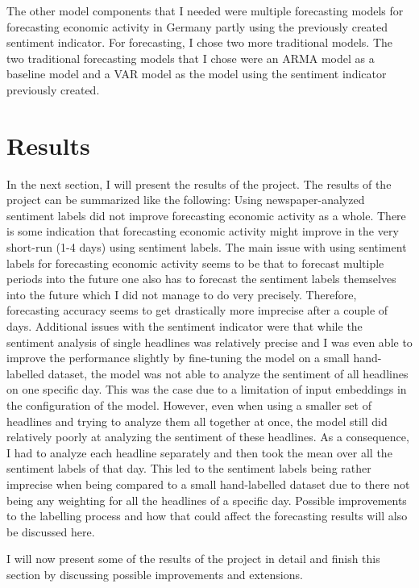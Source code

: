 \documentclass[11pt, a4paper, leqno]{article}
\begin{document}
The other model components that I needed were multiple forecasting models for forecasting economic activity in Germany partly using the previously created sentiment indicator. For forecasting, I chose two more traditional models. The two traditional forecasting models that I chose were an ARMA model as a baseline model and a VAR model as the model using the sentiment indicator previously created.

\section{Results}

In the next section, I will present the results of the project. The results of the project can be summarized like the following: Using newspaper-analyzed sentiment labels did not improve forecasting economic activity as a whole. There is some indication that forecasting economic activity might improve in the very short-run (1-4 days) using sentiment labels. The main issue with using sentiment labels for forecasting economic activity seems to be that to forecast multiple periods into the future one also has to forecast the sentiment labels themselves into the future which I did not manage to do very precisely. Therefore, forecasting accuracy seems to get drastically more imprecise after a couple of days. Additional issues with the sentiment indicator were that while the sentiment analysis of single headlines was relatively precise and I was even able to improve the performance slightly by fine-tuning the model on a small hand-labelled dataset, the model was not able to analyze the sentiment of all headlines on one specific day. This was the case due to a limitation of input embeddings in the configuration of the model. However, even when using a smaller set of headlines and trying to analyze them all together at once, the model still did relatively poorly at analyzing the sentiment of these headlines. As a consequence, I had to analyze each headline separately and then took the mean over all the sentiment labels of that day. This led to the sentiment labels being rather imprecise when being compared to a small hand-labelled dataset due to there not being any weighting for all the headlines of a specific day. Possible improvements to the labelling process and how that could affect the forecasting results will also be discussed here.

I will now present some of the results of the project in detail and finish this section by discussing possible improvements and extensions.
\end{document}
